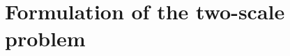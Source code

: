 \documentclass[MikaelDissertation.tex]{subfiles}
\begin{document}
%   
%     
% 



\chapter{Formulation of the two-scale problem}
\end{document}

